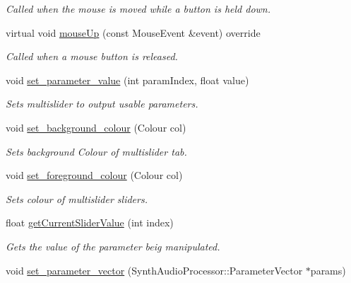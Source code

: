 \begin{DoxyCompactItemize}
\begin{DoxyCompactList}\small\item\em Called when the mouse is moved while a button is held down. \end{DoxyCompactList}\item 
virtual void \hyperlink{class_multi_slider_a3a002d5eaf8413e2dfefc40580ba1922}{mouse\+Up} (const Mouse\+Event \&event) override\hypertarget{class_multi_slider_a3a002d5eaf8413e2dfefc40580ba1922}{}\label{class_multi_slider_a3a002d5eaf8413e2dfefc40580ba1922}

\begin{DoxyCompactList}\small\item\em Called when a mouse button is released. \end{DoxyCompactList}\item 
void \hyperlink{class_multi_slider_a46aa5cd567343e1d25d06ef9e517c9b6}{set\+\_\+parameter\+\_\+value} (int param\+Index, float value)\hypertarget{class_multi_slider_a46aa5cd567343e1d25d06ef9e517c9b6}{}\label{class_multi_slider_a46aa5cd567343e1d25d06ef9e517c9b6}

\begin{DoxyCompactList}\small\item\em Sets multislider to output usable parameters. \end{DoxyCompactList}\item 
void \hyperlink{class_multi_slider_a00b71ab550c43ef5d66e57b867a220b0}{set\+\_\+background\+\_\+colour} (Colour col)\hypertarget{class_multi_slider_a00b71ab550c43ef5d66e57b867a220b0}{}\label{class_multi_slider_a00b71ab550c43ef5d66e57b867a220b0}

\begin{DoxyCompactList}\small\item\em Sets background Colour of multislider tab. \end{DoxyCompactList}\item 
void \hyperlink{class_multi_slider_a2f2eec14c4878ccaebc7bfaca6391fc3}{set\+\_\+foreground\+\_\+colour} (Colour col)\hypertarget{class_multi_slider_a2f2eec14c4878ccaebc7bfaca6391fc3}{}\label{class_multi_slider_a2f2eec14c4878ccaebc7bfaca6391fc3}

\begin{DoxyCompactList}\small\item\em Sets colour of multislider sliders. \end{DoxyCompactList}\item 
float \hyperlink{class_multi_slider_a28d26d367776824e50ba5386343d83e8}{get\+Current\+Slider\+Value} (int index)
\begin{DoxyCompactList}\small\item\em Gets the value of the parameter beig manipulated. \end{DoxyCompactList}\item 
void \hyperlink{class_multi_slider_a604e9e59c5045acc29b8a1ac6e85a102}{set\+\_\+parameter\+\_\+vector} (Synth\+Audio\+Processor\+::\+Parameter\+Vector $\ast$params)\hypertarget{class_multi_slider_a604e9e59c5045acc29b8a1ac6e85a102}{}\label{class_multi_slider_a604e9e59c5045acc29b8a1ac6e85a102}


\end{DoxyCompactItemize}
